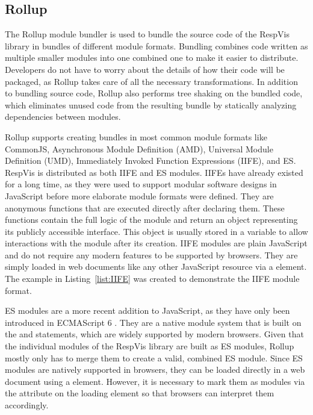 \subsection{Rollup}
\label{sec:Rollup}

The Rollup module bundler is used to bundle the source code of the RespVis library in bundles of different module formats.
Bundling combines code written as multiple smaller modules into one combined one to make it easier to distribute.
Developers do not have to worry about the details of how their code will be packaged, as Rollup takes care of all the necessary transformations.
In addition to bundling source code, Rollup also performs tree shaking on the bundled code, which eliminates unused code from the resulting bundle by statically analyzing dependencies between modules.

Rollup supports creating bundles in most common module formats like CommonJS, Asynchronous Module Definition (AMD), Universal Module Definition (UMD), Immediately Invoked Function Expressions (IIFE), and ES.
RespVis is distributed as both IIFE and ES modules.
IIFEs have already existed for a long time, as they were used to support modular software designs in JavaScript before more elaborate module formats were defined.
They are anonymous functions that are executed directly after declaring them.
These functions contain the full logic of the module and return an object representing its publicly accessible interface.
This object is usually stored in a variable to allow interactions with the module after its creation. 
IIFE modules are plain JavaScript and do not require any modern features to be supported by browsers.
They are simply loaded in web documents like any other JavaScript resource via a  element.
The example in Listing~\ref{list:IIFE} was created to demonstrate the IIFE module format. 

ES modules are a more recent addition to JavaScript, as they have only been introduced in ECMAScript 6 \parencite{ECMAScript6}.
They are a native module system that is built on the  and  statements, which are widely supported by modern browsers.
Given that the individual modules of the RespVis library are built as ES modules, Rollup mostly only has to merge them to create a valid, combined ES module.
Since ES modules are natively supported in browsers, they can be loaded directly in a web document using a  element.
However, it is necessary to mark them as modules via the  attribute on the loading  element so that browsers can interpret them accordingly.


